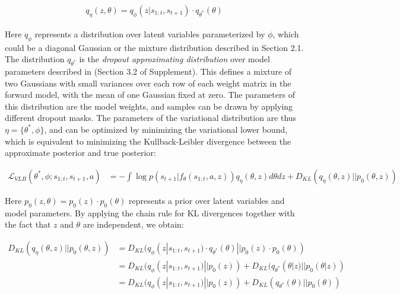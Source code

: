\documentclass{article} %
\begin{document}
\begin{align*}
  q_\eta(z, \theta) = q_\phi(z | s_{1:t}, s_{t+1}) \cdot q_{\theta^*}(\theta)
\end{align*}

Here $q_\phi$ represents a distribution over latent variables parameterized by $\phi$, which could be a diagonal Gaussian or the mixture distribution described in Section 2.1. 
The distribution $q_{\theta^*}$ is the \textit{dropout approximating distribution} over model parameters described in \citep{Gal16} (Section 3.2 of Supplement). 
This defines a mixture of two Gaussians with small variances over each row of each weight matrix in the forward model, with the mean of one Gaussian fixed at zero. The parameters of this distribution are the model weights, and samples can be drawn by applying different dropout masks. The parameters of the variational distribution are thus $\eta = \{ \theta^*, \phi \}$, 
and can be optimized by minimizing the variational lower bound, which is equivalent to minimizing the Kullback-Leibler divergence between the approximate posterior and true posterior:



\begin{align}
  \mathcal{L}_{VLB}(\theta^*, \phi; s_{1:t}, s_{t+1}, a) &= -\int \log p(s_{t+1} | f_\theta(s_{1:t}, a, z)) q_\eta(\theta, z) d\theta dz +  D_{KL}(q_\eta(\theta, z) || p_0(\theta, z))
  \label{elbo}
\end{align}

Here $p_0(z, \theta) = p_0(z) \cdot p_0(\theta)$ represents a prior over latent variables and model parameters. By applying the chain rule for KL divergences together with the fact that $z$ and $\theta$ are independent, we obtain:

\begin{align*}
D_{KL}(q_\eta(\theta, z) || p_0(\theta, z)) &= D_{KL}(q_\phi(z | s_{1:t}, s_{t+1}) \cdot q_{\theta^*}(\theta) || p_0(z) \cdot p_0(\theta)) \\
&= D_{KL}(q_\phi(z | s_{1:t}, s_{t+1}) || p_0(z)) + D_{KL}(q_{\theta^*}(\theta | z) || p_0(\theta | z))  \\
&= D_{KL}(q_\phi(z | s_{1:t}, s_{t+1}) || p_0(z)) + D_{KL}(q_{\theta^*}(\theta) || p_0(\theta))  \\
\end{align*}
\end{document}
